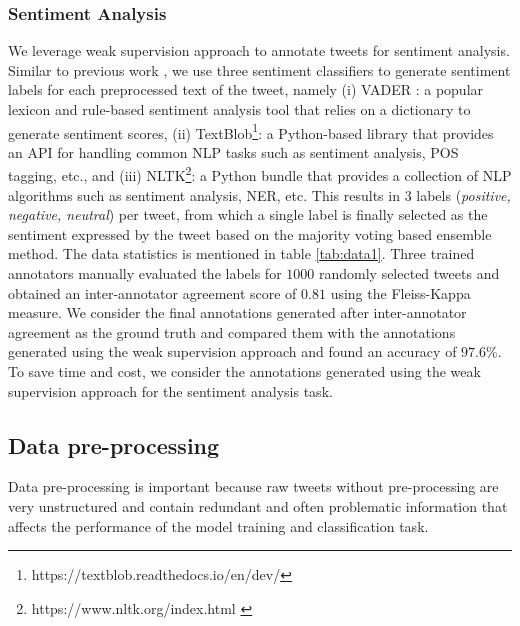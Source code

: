 \documentclass[letterpaper]{article} %
\begin{document}
\subsubsection{Sentiment Analysis}
We leverage weak supervision approach to annotate tweets for sentiment analysis. Similar to previous work \cite{singh2021multitask}, we use three sentiment classifiers to generate sentiment labels for each preprocessed text of the tweet, namely (i) VADER \cite{hutto2014vader}: a popular lexicon and rule-based sentiment analysis tool that relies on a dictionary to generate sentiment scores, (ii) TextBlob\footnote{https://textblob.readthedocs.io/en/dev/}: a Python-based library that provides an API for handling common NLP tasks such as sentiment analysis, POS tagging, etc., and (iii) NLTK\footnote{
https://www.nltk.org/index.html \label{nltk}}: a Python bundle that provides a collection of NLP algorithms such as sentiment analysis, NER, etc. This results in $3$ labels (\textit{positive, negative, neutral}) per tweet, from which a single label is finally selected as the sentiment expressed by the tweet based on the majority voting based ensemble method. The data statistics is mentioned in table \ref{tab:data1}. Three trained annotators manually evaluated the labels for $1000$ randomly selected tweets and obtained an inter-annotator agreement score of $0.81$ using the Fleiss-Kappa measure. We consider the final annotations generated after inter-annotator agreement as the ground truth and compared them with the annotations generated using the weak supervision approach and found an accuracy of $97.6\%$. To save time and cost, we consider the annotations generated using the weak supervision approach for the sentiment analysis task.

\begin{table}
\centering
{}
 \setlength{\abovecaptionskip}{2pt}
  \setlength{\belowcaptionskip}{-5pt}
\caption{Data Statistics for Sentiment Task}
\label{tab:data1}
\end{table}

\subsection{Data pre-processing} \label{data_preprocess}
Data pre-processing is important because raw tweets without pre-processing are very unstructured and contain redundant and often problematic information that affects the performance of the model training and classification task.
\end{document}
